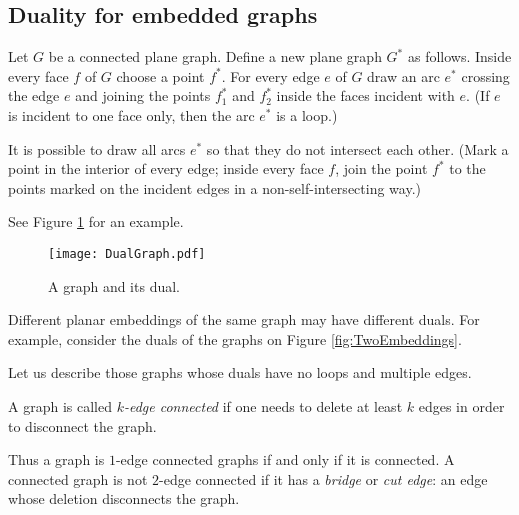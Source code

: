 \begin{page}

\subsection{Duality for embedded graphs}
Let $G$ be a connected plane graph.
Define a new plane graph $G^*$ as follows.
Inside every face $f$ of $G$ choose a point $f^*$.
For every edge $e$ of $G$ draw an arc $e^*$ crossing the edge $e$ and joining the points $f_1^*$ and $f_2^*$ inside the faces incident with $e$.
(If $e$ is incident to one face only, then the arc $e^*$ is a loop.)

It is possible to draw all arcs $e^*$ so that they do not intersect each other.
(Mark a point in the interior of every edge;
inside every face $f$, join the point $f^*$ to the points marked on the incident edges in a non-self-intersecting way.)

See Figure \ref{fig:DualGraph} for an example.

\begin{figure}[ht]
\begin{center}
\texttt{[image: DualGraph.pdf]}
\end{center}
\caption{A graph and its dual.}
\label{fig:DualGraph}
\end{figure}

Different planar embeddings of the same graph may have different duals.
For example, consider the duals of the graphs on Figure \ref{fig:TwoEmbeddings}.

Let us describe those graphs whose duals have no loops and multiple edges.


\end{page}

\begin{page}

\begin{dfn}
A graph is called \emph{$k$-edge connected} if one needs to delete at least $k$ edges in order to disconnect the graph.
\end{dfn}

\end{page}

\begin{page}

Thus a graph is $1$-edge connected graphs if and only if it is connected.
A connected graph is not $2$-edge connected if it has a \emph{bridge} or \emph{cut edge}: an edge whose deletion disconnects the graph.


\end{page}

